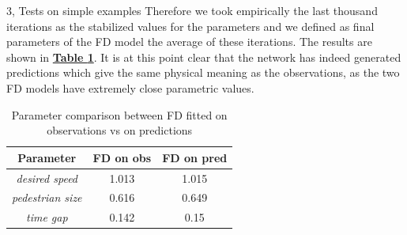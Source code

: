 \documentclass[10pt,a4paper]{article}
\begin{document}
\begin{task}{3, Tests on simple examples}
Therefore we took empirically the last thousand iterations as the stabilized values for the parameters and we defined as final parameters of the FD model the average of these iterations. The results are shown in \textbf{\hyperref[tab:vadere-fd-comparison]{Table \ref{tab:vadere-fd-comparison}}}. It is at this point clear that the network has indeed generated predictions which give the same physical meaning as the observations, as the two FD models have extremely close parametric values.

\begin{table}[H]
    \centering
    \begin{tabular}{|ccc|}
        \hline
        \textbf{Parameter} & \textbf{FD on obs} & \textbf{FD on pred}\\
        \hline
        \hline
        \textit{desired speed} & 1.013 & 1.015\\
        \hline
        \textit{pedestrian size} & 0.616 & 0.649\\
        \hline
        \textit{time gap} & 0.142 & 0.15\\
        \hline
    \end{tabular}
    \caption{Parameter comparison between FD fitted on observations vs on predictions}
    \label{tab:vadere-fd-comparison}
\end{table}

\end{task}
\end{document}
